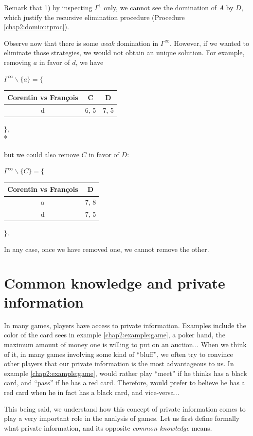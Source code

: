 \begin{example}
Remark that 1) by inspecting $\Gamma^1$ only, we cannot see the domination of $A$ by $D$, which justify the recursive elimination procedure (Procedure \ref{chap2:domioutproc}).

Observe now that there is some \emph{weak} domination in $\Gamma^\infty$. However, if we wanted to eliminate those strategies, we would not obtain an unique solution.
For example, removing $a$ in favor of $d$, we have
\begin{center}
$\Gamma^{\infty}\backslash \{ a \}= \Bigg \{$
\begin{tabular}{c|cc}
  Corentin vs Fran\c{c}ois   & C & D\\
\hline d   & 6, 5 & 7, 5 \\
\end{tabular}
$\Bigg \},$\\*
\end{center}
but we could also remove $C$ in favor of $D$:
\begin{center}
$\Gamma^{\infty}  \backslash \{C\} = \Bigg \{$
\begin{tabular}{c|c}
  Corentin vs Fran\c{c}ois   & D\\
\hline a   & 7, 8 \\
 d   & 7, 5 \\
\end{tabular}
$\Bigg \}.$
\end{center}
In any case, once we have removed one, we cannot remove the other.
\end{example}

\section{Common knowledge and private information}


In many games, players have access to private information.
Examples include the color of the card \TAtwo{} sees in example \ref{chap2:example:game}, a poker hand, the maximum amount of money one is willing to put on an auction... When we think of it, in many games involving some kind of ``bluff'', we often try to convince other players that our private information is the most advantageous to us.
In example \ref{chap2:example:game}, \TAone{} would rather play ``meet'' if he thinks \TAtwo{} has a black card, and ``pass'' if he has a red card. Therefore, \TAtwo{} would prefer \TAone{} to believe he has a red card when he in fact has a black card, and vice-versa...

This being said, we understand how this concept of private information comes to play a very important role in the analysis of games. Let us first define formally
what private information, and its opposite \emph{common knowledge} means.

